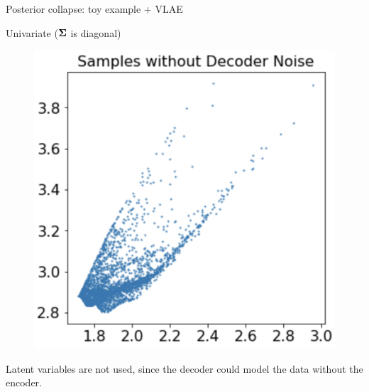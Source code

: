 \documentclass{beamer}
\begin{document}
\begin{frame}{Posterior collapse: toy example + VLAE}
\begin{block}{Univariate ($\boldsymbol{\Sigma}$ is diagonal)}
\begin{minipage}[t]{0.33\columnwidth}
\begin{figure}[h]
			\end{figure}
		\end{minipage}%
		\begin{minipage}[t]{0.33\columnwidth}
			\begin{figure}[h]
				\centering
				\includegraphics[width=.75\linewidth]{figs/posterior_collapse_toy_6.png}
			\end{figure}
		\end{minipage}
		Latent variables are not used, since the decoder could model the data without the encoder.
	\end{block}
\end{frame}
\end{document}
